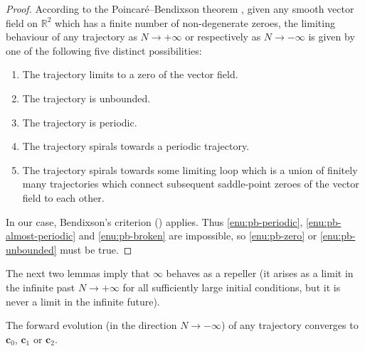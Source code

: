 \begin{proof}
According to the Poincar\'e--Bendixson theorem \cite{bendixson1901}, given any smooth vector field on $\mathbb{R}^{2}$ which has a finite number of non-degenerate zeroes, the limiting behaviour of any trajectory as $N\to+\infty$ or respectively as $N\to-\infty$ is given by one of the following five distinct possibilities: 
\begin{enumerate}
\item \label{enu:pb-zero}The trajectory limits to a zero of the vector field. 
\item \label{enu:pb-unbounded}The trajectory is unbounded. 
\item \label{enu:pb-periodic}The trajectory is periodic.
\item \label{enu:pb-almost-periodic}The trajectory spirals towards a periodic trajectory.
\item \label{enu:pb-broken}The trajectory spirals towards some limiting loop which is a union of finitely many trajectories which connect subsequent saddle-point zeroes of the vector field to each other. 
\end{enumerate}
In our case, Bendixson's criterion () applies. Thus \ref{enu:pb-periodic}, \ref{enu:pb-almost-periodic} and \ref{enu:pb-broken} are impossible, so \ref{enu:pb-zero} or \ref{enu:pb-unbounded} must be true. 
\end{proof}
The next two lemmas imply that $\bm{\infty}$ behaves as a repeller (it arises as a limit in the infinite past $N\to+\infty$ for all sufficiently large initial conditions, but it is never a limit in the infinite future).

\begin{lem}
\label{lem:D-unbounded} The forward evolution (in the direction $N\to-\infty$) of any trajectory converges to $\mathbf{c}_{0}$, $\mathbf{c}_{1}$ or $\mathbf{c}_{2}$. 
\end{lem}

